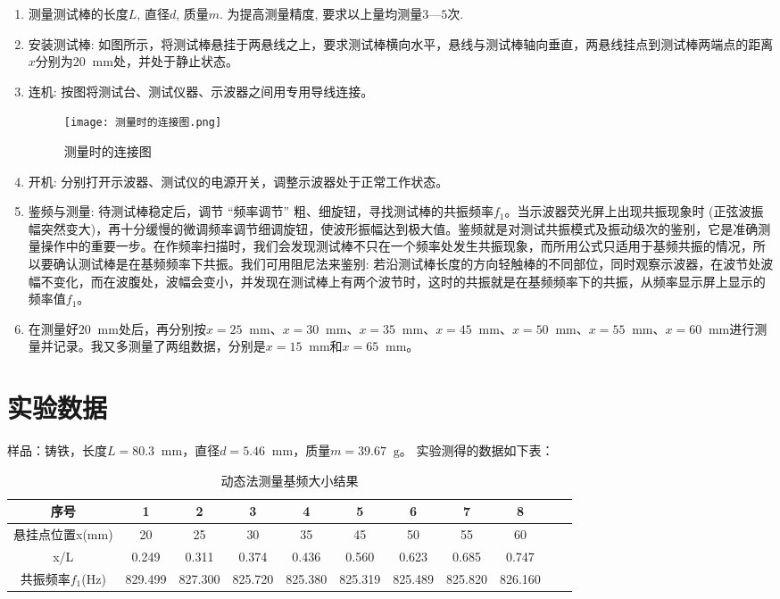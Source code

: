 \documentclass[11pt]{article}
\newcommand*{\unit}[1]{\mathop{}\!\mathrm{#1}}
\begin{document}
\begin{enumerate}
    \item 测量测试棒的长度$L$, 直径$d$, 质量$m$. 为提高测量精度, 要求以上量均测量$3$—$5$次.
    \item 安装测试棒: 如图所示，将测试棒悬挂于两悬线之上，要求测试棒横向水平，悬线与测试棒轴向垂直，两悬线挂点到测试棒两端点的距离$x$分别为$20\unit{mm}$处，并处于静止状态。
    \item 连机: 按图将测试台、测试仪器、示波器之间用专用导线连接。
    
\begin{figure}[htbp]
    \centering
    \texttt{[image: 测量时的连接图.png]}
    \caption{测量时的连接图}
\end{figure}

    \item 开机: 分别打开示波器、测试仪的电源开关，调整示波器处于正常工作状态。
    \item 鉴频与测量: 待测试棒稳定后，调节 “频率调节” 粗、细旋钮，寻找测试棒的共振频率$f_1$。当示波器荧光屏上出现共振现象时 (正弦波振幅突然变大)，再十分缓慢的微调频率调节细调旋钮，使波形振幅达到极大值。鉴频就是对测试共振模式及振动级次的鉴别，它是准确测量操作中的重要一步。在作频率扫描时，我们会发现测试棒不只在一个频率处发生共振现象，而所用公式只适用于基频共振的情况，所以要确认测试棒是在基频频率下共振。我们可用阻尼法来鉴别: 若沿测试棒长度的方向轻触棒的不同部位，同时观察示波器，在波节处波幅不变化，而在波腹处，波幅会变小，并发现在测试棒上有两个波节时，这时的共振就是在基频频率下的共振，从频率显示屏上显示的频率值$f_1$。
    \item 在测量好$20\unit{mm}$处后，再分别按$x=25\unit{mm}$、$x=30\unit{mm}$、$x=35\unit{mm}$、$x=45\unit{mm}$、$x=50\unit{mm}$、$x=55\unit{mm}$、$x=60\unit{mm}$进行测量并记录。我又多测量了两组数据，分别是$x=15\unit{mm}$和$x=65\unit{mm}$。
\end{enumerate}

\section{实验数据}

样品：铸铁，长度$L=80.3\unit{mm}$，直径$d=5.46\unit{mm}$，质量$m=39.67\unit{g}$。
实验测得的数据如下表：

\begin{table}[H]
    \centering
    \begin{tabular}{|c|c|c|c|c|c|c|c|c|c|c|}
        \hline
        序号&1&2&3&4&5&6&7&8\\
        \hline
        悬挂点位置x(mm)&20    & 25    & 30    & 35    & 45    & 50    & 55    & 60 \\
        \hline
        x/L&0.249  & 0.311  & 0.374  & 0.436  & 0.560  & 0.623  & 0.685  & 0.747\\
        \hline
        共振频率$f_1$(Hz)&829.499  & 827.300  & 825.720  & 825.380  & 825.319  & 825.489  & 825.820  & 826.160\\
        \hline
    \end{tabular}
    \caption{动态法测量基频大小结果}
\end{table}
\end{document}
